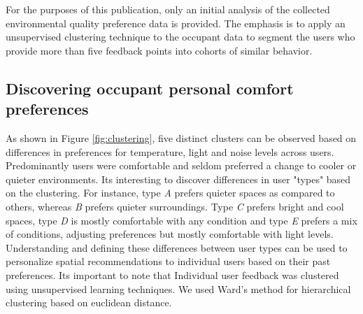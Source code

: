 
For the purposes of this publication, only an initial analysis of the collected environmental quality preference data is provided. The emphasis is to apply an unsupervised clustering technique to the occupant data to segment the users who provide more than five feedback points into cohorts of similar behavior. 

\subsection{Discovering occupant personal comfort preferences}
 
As shown in Figure \ref{fig:clustering}, five distinct clusters can be observed based on differences in preferences for temperature, light and noise levels across users. Predominantly users were comfortable and seldom preferred a change to cooler or quieter environments. Its interesting to discover differences in user "types" based on the clustering. For instance, type \emph{A} prefers quieter spaces as compared to others, whereas \emph{B} prefers quieter surroundings. Type \emph{C} prefers bright and cool spaces, type \emph{D} is mostly comfortable with any condition and type \emph{E} prefers a mix of conditions, adjusting preferences but mostly comfortable with light levels. Understanding and defining these differences between user types can be used to personalize spatial recommendations to individual users based on their past preferences. Its important to note that Individual user feedback was clustered using unsupervised learning techniques. We used Ward's method for hierarchical clustering based on euclidean distance. 





